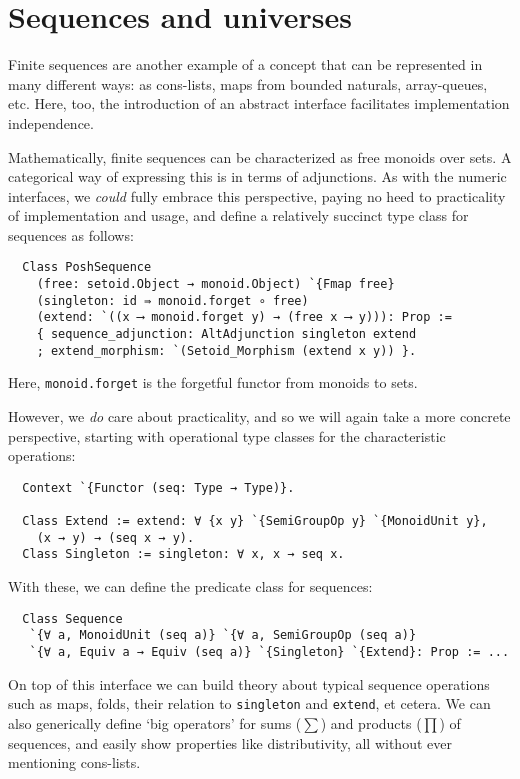 \documentclass[a4paper,10pt,runningheads]{llncs}
\begin{document}


\section{Sequences and universes}\label{sequences}

Finite sequences are another example of a concept that can be represented in many different ways: as cons-lists, maps from bounded naturals, array-queues, etc. Here, too, the introduction of an abstract interface facilitates implementation independence.

Mathematically, finite sequences can be characterized as free monoids over sets. A categorical way of expressing this is in terms of adjunctions. As with the numeric interfaces, we \emph{could} fully embrace this perspective, paying no heed to practicality of implementation and usage, and define a relatively succinct type class for sequences as follows:
\begin{lstlisting}
  Class PoshSequence
    (free: setoid.Object → monoid.Object) `{Fmap free}
    (singleton: id ⇛ monoid.forget ∘ free)
    (extend: `((x ⟶ monoid.forget y) → (free x ⟶ y))): Prop :=
    { sequence_adjunction: AltAdjunction singleton extend
    ; extend_morphism: `(Setoid_Morphism (extend x y)) }.
\end{lstlisting}
Here, \lstinline|monoid.forget| is the forgetful functor from monoids to sets.

However, we \emph{do} care about practicality, and so we will again take a more concrete perspective, starting with operational type classes for the characteristic operations:
\begin{lstlisting}
  Context `{Functor (seq: Type → Type)}.

  Class Extend := extend: ∀ {x y} `{SemiGroupOp y} `{MonoidUnit y},
    (x → y) → (seq x → y).
  Class Singleton := singleton: ∀ x, x → seq x.
\end{lstlisting}
With these, we can define the predicate class for sequences:
\begin{lstlisting}
  Class Sequence
   `{∀ a, MonoidUnit (seq a)} `{∀ a, SemiGroupOp (seq a)}
   `{∀ a, Equiv a → Equiv (seq a)} `{Singleton} `{Extend}: Prop := ...
\end{lstlisting}
On top of this interface we can build theory about typical sequence operations such as maps, folds, their relation to \lstinline|singleton| and \lstinline|extend|, et cetera. We can also generically define `big operators' for sums ($\sum$) and products ($\prod$) of sequences, and easily show properties like distributivity, all without ever mentioning cons-lists.
\end{document}

